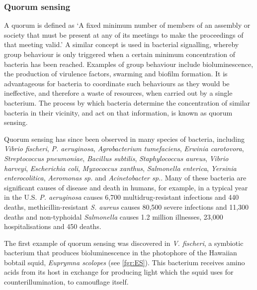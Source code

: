 \subsubsection{Quorum sensing\label{sec:QS}}

A quorum is defined as `A fixed minimum number of members of an assembly or society that must be present at any of its meetings to make the proceedings of that meeting valid.' \cite{Dictionary}  
A similar concept is used in bacterial signalling, whereby group behaviour is only triggered when a certain minimum concentration of bacteria has been reached. Examples of group behaviour include bioluminescence, the production of virulence factors, swarming and biofilm formation\cite{Miller2001}.  
It is advantageous for bacteria to coordinate such behaviours as they would be ineffective, and therefore a waste of resources, when carried out by a single bacterium.
The process by which bacteria determine the concentration of similar bacteria in their vicinity, and act on that information, is known as quorum sensing.

Quorum sensing has since been observed in many species of bacteria, including \textit{Vibrio fischeri}, \textit{P. aeruginosa}, \textit{Agrobacterium tumefaciens}, \textit{Erwinia carotovora}, \textit{Streptococcus pneumoniae}, \textit{Bacillus subtilis}, \textit{Staphylococcus aureus}, \textit{Vibrio harveyi}, \textit{Escherichia coli}, \textit{Myxococcus xanthus}, \textit{Salmonella enterica}, \textit{Yersinia enterocolitica}, \textit{Aeromonas sp.} and \textit{Acinetobacter sp.}\cite{Miller2001,Fuqua1994,Waters2005,Atkinson2006,Chan2011,Sauer2002,Michael2001,Ahmer2004,Nealson1970,Visick2006}. 
Many of these bacteria are significant causes of disease and death in humans, for example, in a typical year in the U.S. \textit{P. aeruginosa} causes 6,700 multidrug-resistant infections and 440 deaths, methicillin-resistant \textit{S. aureus} causes 80,500 severe infections and 11,300 deaths and non-typhoidal \textit{Salmonella} causes 1.2 million illnesses, 23,000
hospitalisations and 450 deaths\cite{ResistanceUS}.


The first example of quorum sensing was discovered in \textit{V. fischeri}, a symbiotic bacterium that produces bioluminescence in the photophore of the Hawaiian bobtail squid, \textit{Euprymna scolopes} \cite{Nealson1970,Miller2001,Visick2006} (see \ref{fgr:ES}). This bacterium receives amino acids\cite{Graf1998, Lemus2000} from its host in exchange for producing light which the squid uses for counterillumination, to camouflage itself\cite{Jones2004}. 

